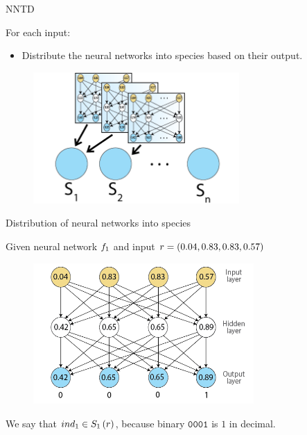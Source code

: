 \begin{frame}{NNTD}
\begin{center}
For each input:
  \begin{itemize}
	  \item Distribute the neural networks into species based on their output.
  \end{itemize}
     \begin{figure}[p]
  \includegraphics[width=0.7\textwidth]{images/speciesnn.png}
  \end{figure}
\end{center}
\end{frame}

\begin{frame}{Distribution of neural networks into species}
\begin{center}
Given neural network $f_1$ and input $r = (0.04, 0.83, 0.83, 0.57)$
  \begin{figure}[p]
  \includegraphics[width=0.75\textwidth]{images/nntdexample1.png}
  \end{figure}
We say that $ind_1 \in S_{1}\left(r\right)$, because binary $\texttt{0001}$ is $1$ in decimal.
\end{center}
\end{frame}

